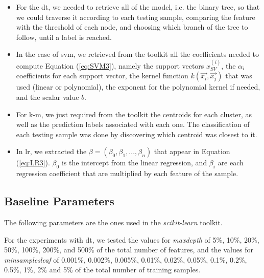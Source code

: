 \begin{itemize}
  
    \item For the \ac{dt}, we needed to retrieve all of the model, i.e. the binary tree, so that we could traverse it according to each testing sample, comparing the feature with the threshold of each node, and choosing which branch of the tree to follow, until a label is reached. 

    \item In the case of \ac{svm}, we retrieved from the toolkit all the coefficients needed to compute Equation (\ref{eq:SVM3}), namely the support vectors $x_{SV}^{(i)}$, the $\alpha_i$ coefficients for each support vector, the kernel function $k({\vec {x_{i}}},{\vec {x_{j}}})$ that was used (linear or polynomial), the exponent for the polynomial kernel if needed, and the scalar value $b$.


    \item For \ac{k-m}, we just required from the toolkit the centroids for each cluster, as well as the prediction labels associated with each one. The classification of each testing sample was done by discovering which centroid was closest to it.

    \item In \ac{lr}, we extracted the $\beta=(\beta_0,\beta_1,...,\beta_n)$ that appear in Equation (\ref{eq:LR3}). $\beta_0$ is the intercept from the linear regression, and $\beta_i$ are each regression coefficient that are multiplied by each feature of the sample.

\end{itemize}


\subsection{Baseline Parameters}

The following parameters are the ones used in the \textit{scikit-learn} toolkit.

For the experiments with \ac{dt}, we tested the values for \textit{max\textunderscore depth} of 5\%, 10\%, 20\%, 50\%, 100\%, 200\%, and 500\% of the total number of features, and the values for \textit{min\textunderscore samples\textunderscore leaf} of 0.001\%, 0.002\%, 0.005\%, 0.01\%, 0.02\%, 0.05\%, 0.1\%, 0.2\%, 0.5\%, 1\%, 2\% and 5\% of the total number of training samples.

